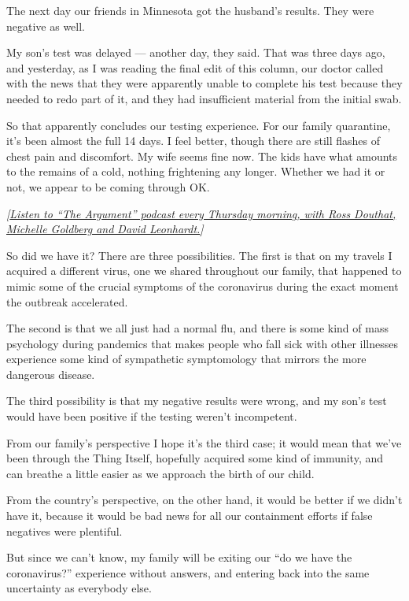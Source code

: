 The next day our friends in Minnesota got the husband's results. They
were negative as well.

My son's test was delayed --- another day, they said. That was three
days ago, and yesterday, as I was reading the final edit of this column,
our doctor called with the news that they were apparently unable to
complete his test because they needed to redo part of it, and they had
insufficient material from the initial swab.

So that apparently concludes our testing experience. For our family
quarantine, it's been almost the full 14 days. I feel better, though
there are still flashes of chest pain and discomfort. My wife seems fine
now. The kids have what amounts to the remains of a cold, nothing
frightening any longer. Whether we had it or not, we appear to be coming
through OK.

\emph{{[}}\href{https://www.nytimes.com/column/the-argument}{\emph{Listen
to ``The Argument'' podcast every Thursday morning, with Ross Douthat,
Michelle Goldberg and David Leonhardt.}}\emph{{]}}

So did we have it? There are three possibilities. The first is that on
my travels I acquired a different virus, one we shared throughout our
family, that happened to mimic some of the crucial symptoms of the
coronavirus during the exact moment the outbreak accelerated.

The second is that we all just had a normal flu, and there is some kind
of mass psychology during pandemics that makes people who fall sick with
other illnesses experience some kind of sympathetic symptomology that
mirrors the more dangerous disease.

The third possibility is that my negative results were wrong, and my
son's test would have been positive if the testing weren't incompetent.

From our family's perspective I hope it's the third case; it would mean
that we've been through the Thing Itself, hopefully acquired some kind
of immunity, and can breathe a little easier as we approach the birth of
our child.

From the country's perspective, on the other hand, it would be better if
we didn't have it, because it would be bad news for all our containment
efforts if false negatives were plentiful.

But since we can't know, my family will be exiting our ``do we have the
coronavirus?'' experience without answers, and entering back into the
same uncertainty as everybody else.

